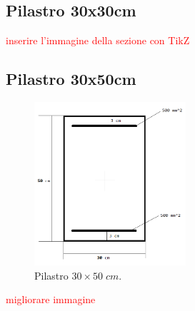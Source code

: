 \documentclass[10pt]{article}
\begin{document}
%
%





\subsection{Pilastro 30x30cm}

\textcolor{red}{inserire l'immagine della sezione con TikZ}






\subsection{Pilastro 30x50cm}


\begin{figure}[H]
\centering
\includegraphics[width=0.5\textwidth]{img/pilastro30x50.png}
\caption{\footnotesize Pilastro $30 \times 50 \; cm$.}
\end{figure}
\textcolor{red}{migliorare immagine}

\end{document}

